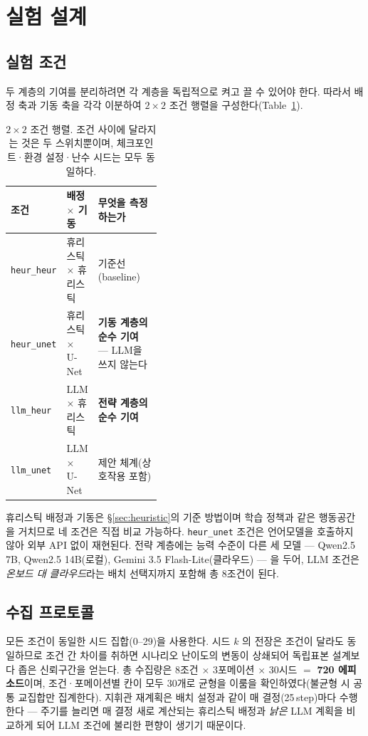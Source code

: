 \section{실험 설계}
\label{sec:experiment}

\subsection{실험 조건}

두 계층의 기여를 분리하려면 각 계층을 독립적으로 켜고 끌 수 있어야 한다. 따라서 배정 축과
기동 축을 각각 이분하여 $2\times2$ 조건 행렬을 구성한다(Table~\ref{tab:conditions}).

\begin{table}[tp]
\centering
\caption{$2\times2$ 조건 행렬. 조건 사이에 달라지는 것은 두 스위치뿐이며, 체크포인트·환경
         설정·난수 시드는 모두 동일하다.}
\label{tab:conditions}
\footnotesize
\begin{tabular}{llp{0.42\linewidth}}
\toprule
조건 & 배정 $\times$ 기동 & 무엇을 측정하는가 \\
\midrule
\texttt{heur\_heur} & 휴리스틱 $\times$ 휴리스틱 & 기준선(baseline) \\
\texttt{heur\_unet} & 휴리스틱 $\times$ U-Net    & \textbf{기동 계층의 순수 기여}
                                                   --- LLM을 쓰지 않는다 \\
\texttt{llm\_heur}  & LLM $\times$ 휴리스틱      & \textbf{전략 계층의 순수 기여} \\
\texttt{llm\_unet}  & LLM $\times$ U-Net         & 제안 체계(상호작용 포함) \\
\bottomrule
\end{tabular}
\end{table}

휴리스틱 배정과 기동은 \S\ref{sec:heuristic}의 기준 방법이며 학습 정책과 같은 행동공간을
거치므로 네 조건은 직접 비교 가능하다. \texttt{heur\_unet} 조건은 언어모델을 호출하지 않아
외부 API 없이 재현된다. 전략 계층에는 능력 수준이 다른 세 모델 --- Qwen2.5 7B, Qwen2.5
14B(로컬), Gemini 3.5 Flash-Lite(클라우드) --- 을 두어, LLM 조건은 \emph{온보드 대
클라우드}라는 배치 선택지까지 포함해 총 8조건이 된다.

\subsection{수집 프로토콜}
\label{sec:paired}

모든 조건이 동일한 시드 집합(0--29)을 사용한다. 시드 $k$ 의 전장은 조건이 달라도 동일하므로
조건 간 차이를 취하면 시나리오 난이도의 변동이 상쇄되어 독립표본 설계보다 좁은 신뢰구간을
얻는다. 총 수집량은 8조건 $\times$ 3포메이션 $\times$ 30시드 $=$ \textbf{720 에피소드}이며,
조건·포메이션별 칸이 모두 30개로 균형을 이룸을 확인하였다(불균형 시 공통 교집합만 집계한다).
지휘관 재계획은 배치 설정과 같이 매 결정(25\,step)마다 수행한다 --- 주기를 늘리면 매 결정
새로 계산되는 휴리스틱 배정과 \emph{낡은} LLM 계획을 비교하게 되어 LLM 조건에 불리한 편향이
생기기 때문이다.

